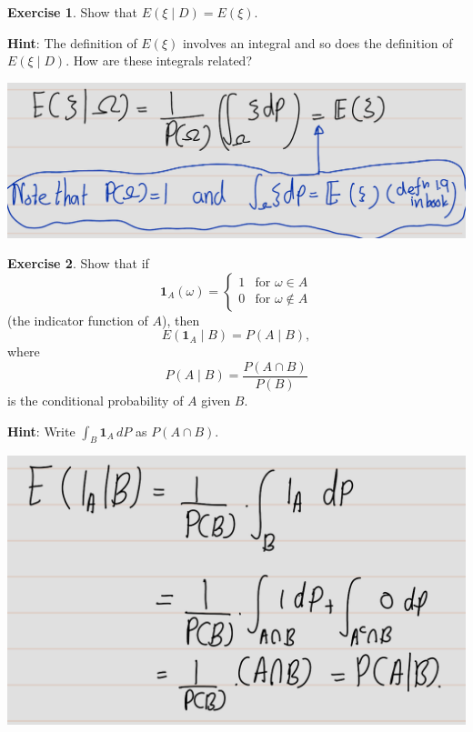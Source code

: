 \documentclass[
]{book}
\theoremstyle{definition}
\theoremstyle{definition}
\theoremstyle{definition}
\newtheorem{exercise}{Exercise}[chapter]
\theoremstyle{definition}
\theoremstyle{remark}
\begin{document}
\begin{exercise}
\protect\hypertarget{exr:unnamed-chunk-44}{}\label{exr:unnamed-chunk-44}Show that \(E(\xi \mid D) = E(\xi)\).

\textbf{Hint}: The definition of \(E(\xi)\) involves an integral and so does the definition of \(E(\xi \mid D)\). How are these integrals related?
\end{exercise}

\includegraphics[width=18cm,height=\textheight]{fig/fig ex2.1.png}

\begin{exercise}
\protect\hypertarget{exr:unnamed-chunk-45}{}\label{exr:unnamed-chunk-45}Show that if
\[
\mathbf{1}_A(\omega) = 
\begin{cases} 
1 & \text{for } \omega \in A \\ 
0 & \text{for } \omega \notin A 
\end{cases}
\]
(the indicator function of \(A\)), then
\[
E(\mathbf{1}_A \mid B) = P(A \mid B),
\]
where
\[
P(A \mid B) = \frac{P(A \cap B)}{P(B)}
\]
is the conditional probability of \(A\) given \(B\).

\textbf{Hint}: Write \(\int_B \mathbf{1}_A \, dP\) as \(P(A \cap B)\).
\end{exercise}

\includegraphics[width=18cm,height=\textheight]{fig/fig ex2.2.png}
\end{document}
